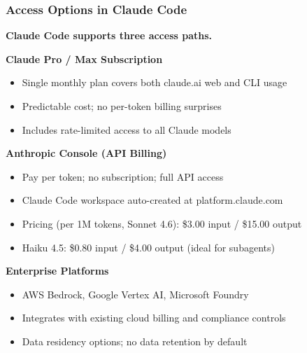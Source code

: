 \begin{frame}[fragile]\frametitle{Access Options in Claude Code}

\textbf{Claude Code supports three access paths.}

\vspace{0.3cm}
\textbf{Claude Pro / Max Subscription}

\begin{itemize}
    \item Single monthly plan covers both claude.ai web and CLI usage
    \item Predictable cost; no per-token billing surprises
    \item Includes rate-limited access to all Claude models
\end{itemize}

\vspace{0.2cm}
\textbf{Anthropic Console (API Billing)}

\begin{itemize}
    \item Pay per token; no subscription; full API access
    \item Claude Code workspace auto-created at platform.claude.com
    \item Pricing (per 1M tokens, Sonnet 4.6): \$3.00 input / \$15.00 output
    \item Haiku 4.5: \$0.80 input / \$4.00 output (ideal for subagents)
\end{itemize}

\vspace{0.2cm}
\textbf{Enterprise Platforms}
\begin{itemize}
    \item AWS Bedrock, Google Vertex AI, Microsoft Foundry
    \item Integrates with existing cloud billing and compliance controls
    \item Data residency options; no data retention by default
\end{itemize}

\end{frame}

